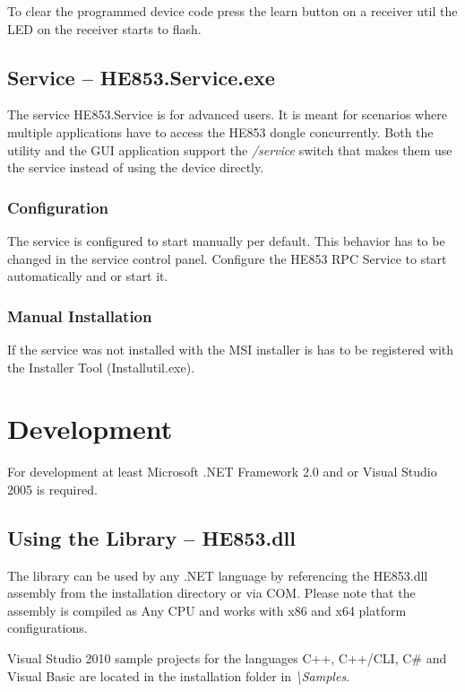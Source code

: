 \documentclass[
a4paper,
oneside,
halfparskip*,
normalheadings,
]
{scrbook}
\begin{document}
To clear the programmed device code press the learn button on a receiver util the LED
on the receiver starts to flash.

\section{Service -- HE853.Service.exe}

The service HE853.Service is for advanced users. It is meant for scenarios where multiple
applications have to access the HE853 dongle concurrently. Both the utility and the
GUI application support the \textit{/service} switch that makes them use the service
instead of using the device directly.

\subsection{Configuration}

The service is configured to start manually per default. This behavior has to be changed
in the service control panel. Configure the HE853 RPC Service to start automatically and
or start it. 

\subsection{Manual Installation}

If the service was not installed with the MSI installer is has to be registered with
the Installer Tool (Installutil.exe).





\chapter{Development}

For development at least Microsoft .NET Framework 2.0 and or Visual Studio 2005 is required.

\section{Using the Library -- HE853.dll}

The library can be used by any .NET language by referencing the HE853.dll assembly from the
installation directory or via COM. Please note that the assembly is compiled as Any CPU
and works with x86 and x64 platform configurations.

Visual Studio 2010 sample projects for the languages C++, C++/CLI, C\# and Visual Basic
are located in the installation folder in \textit{\textbackslash Samples}.
\end{document}
